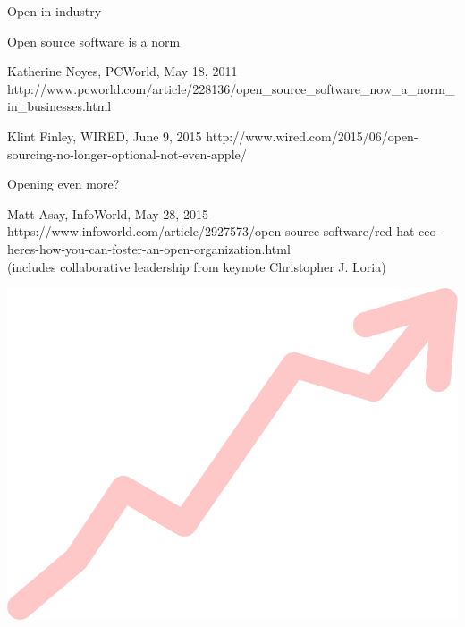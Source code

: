 \documentclass[xcolor={dvipsnames,usenames},beamer,aspectratio=169]{beamer}
\begin{document}
\begin{frame}{Open in industry}

\begin{block}{Open source software is a norm}

%
  {Katherine Noyes, PCWorld, May 18, 2011}%
  {http://www.pcworld.com/article/228136/open_source_software_now_a_norm_in_businesses.html}

%
  {Klint Finley, WIRED, June 9, 2015}%
  {http://www.wired.com/2015/06/open-sourcing-no-longer-optional-not-even-apple/}

\end{block}

\begin{block}{Opening even more?}

%
  {Matt Asay, InfoWorld, May 28, 2015}%
  {https://www.infoworld.com/article/2927573/open-source-software/red-hat-ceo-heres-how-you-can-foster-an-open-organization.html}
\\
{\small (includes collaborative leadership from keynote Christopher J. Loria)}

\end{block}

\centering
\includegraphics[height=0.2\textheight]{./images/general/growing}%

\end{frame}
\end{document}
